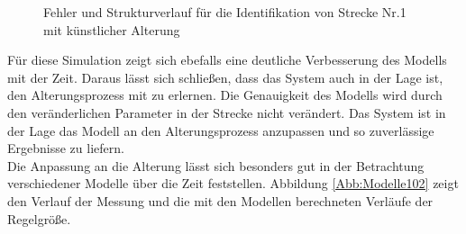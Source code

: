                 \begin{figure}[h]
                    \caption{Fehler und Strukturverlauf für die Identifikation von Strecke Nr.1 mit künstlicher Alterung}
                    \label{Abb:RealTime_Alterung}
                \end{figure}
                Für diese Simulation zeigt sich ebefalls eine deutliche Verbesserung des Modells mit der Zeit. Daraus lässt sich schließen, dass das System auch 
                in der Lage ist, den Alterungsprozess mit zu erlernen. Die Genauigkeit des Modells wird durch den veränderlichen Parameter in der Strecke nicht 
                verändert. Das System ist in der Lage das Modell an den Alterungsprozess anzupassen und so zuverlässige Ergebnisse zu liefern.\\
                Die Anpassung an die Alterung lässt sich besonders gut in der Betrachtung verschiedener Modelle über die Zeit feststellen. Abbildung \ref{Abb:Modelle102} zeigt den 
                Verlauf der Messung und die mit den Modellen berechneten Verläufe der Regelgröße. 
